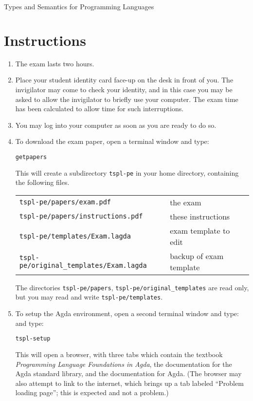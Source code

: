 \documentclass[12pt]{article}
\begin{document}
\pagestyle{empty}
\setcounter{page}{1}

\begin{center}
\large Types and Semantics for Programming Languages
\end{center}

\section*{Instructions}

\begin{enumerate}

\item
  The exam lasts two hours.

\item
  Place your student identity card face-up on the desk in front of you.  The
  invigilator may come to check your identity, and in this case you may be asked
  to allow the invigilator to briefly use your computer.  The exam time has been
  calculated to allow time for such interruptions.

\item
  You may log into your computer as soon as you are ready to do so.

\item
  To download the exam paper, open a terminal window and type:
  \begin{center}
    \texttt{getpapers}
  \end{center}
  This will create a subdirectory \texttt{tspl-pe} in your home directory,
  containing the following files.
  \begin{center}
    \begin{tabular}{ll}
      \texttt{tspl-pe/papers/exam.pdf}                & the exam \\
      \texttt{tspl-pe/papers/instructions.pdf}        & these instructions \\
      \texttt{tspl-pe/templates/Exam.lagda}           & exam template to edit \\
      \texttt{tspl-pe/original\_templates/Exam.lagda} & backup of exam template
    \end{tabular}
  \end{center}
  The directories \texttt{tspl-pe/papers}, \texttt{tspl-pe/original\_templates}
  are read only, but you may read and write \texttt{tspl-pe/templates}.

\item
  To setup the Agda environment, open a second terminal window and type:
  and type:
  \begin{center}
    \texttt{tspl-setup}
  \end{center}
  This will open a browser, with three tabs which contain the textbook
  \emph{Programming Language Foundations in Agda}, the documentation for the
  Agda standard library, and the documentation for Agda.  (The browser may
  also attempt to link to the internet, which brings up a tab labeled
  ``Problem loading page''; this is expected and not a problem.)


\end{enumerate}
\end{document}

